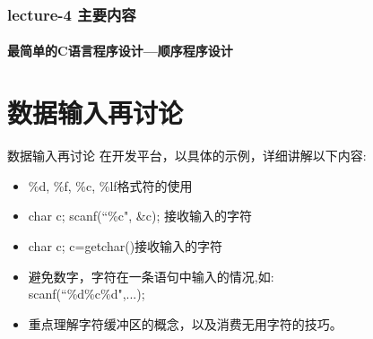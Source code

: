 \begin{frame}
  \frametitle{lecture-4 主要内容}
  \framesubtitle{最简单的C语言程序设计---顺序程序设计}
  \tableofcontents[hideallsubsections]
\end{frame}

\section{数据输入再讨论}

\begin{frame}[fragile]{数据输入再讨论}
在开发平台，以具体的示例，详细讲解以下内容:
\begin{itemize}
	\item \%d, \%f, \%c, \%lf格式符的使用
	\item char c; scanf(``\%c", \&c); 接收输入的字符
	\item char c; c=getchar()接收输入的字符
	\item 避免数字，字符在一条语句中输入的情况,如:\\ scanf(``\%d\%c\%d",...);
	\item 重点理解字符缓冲区的概念，以及消费无用字符的技巧。
\end{itemize}
\end{frame}




